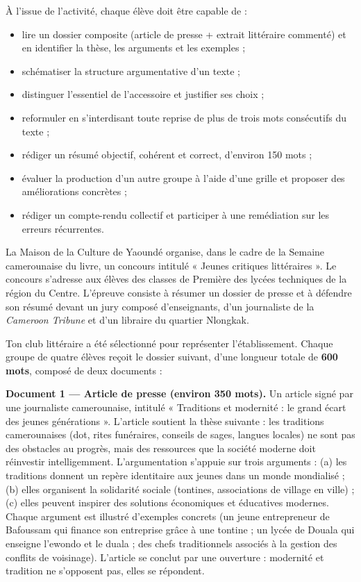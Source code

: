 \documentclass[11pt]{article}
\newcommand{\cle}[1]{{\popxbold\color{popdark}#1}}
\newcounter{popsec}
\newcounter{popsub}
\newcommand{\courssub}[1]{%
  \stepcounter{popsub}%
  \par\vspace{9pt}\noindent{\popxbold\fontsize{11.5}{13}\selectfont\color{popink}{\color{poporange}\thepopsec.\thepopsub}\hspace{6pt}#1}\par\nopagebreak\vspace{4pt}
}
\begin{document}
À l'issue de l'activité, chaque élève doit être capable de :
\begin{itemize}
\item lire un dossier composite (article de presse + extrait littéraire commenté) et en identifier la thèse, les arguments et les exemples ;
\item schématiser la structure argumentative d'un texte ;
\item distinguer l'essentiel de l'accessoire et justifier ses choix ;
\item reformuler en s'interdisant toute reprise de plus de trois mots consécutifs du texte ;
\item rédiger un résumé objectif, cohérent et correct, d'environ 150 mots ;
\item évaluer la production d'un autre groupe à l'aide d'une grille et proposer des améliorations concrètes ;
\item rédiger un compte-rendu collectif et participer à une remédiation sur les erreurs récurrentes.
\end{itemize}

\courssub{Situation}

La \cle{Maison de la Culture de Yaoundé} organise, dans le cadre de la Semaine camerounaise du livre, un concours intitulé « Jeunes critiques littéraires ». Le concours s'adresse aux élèves des classes de Première des lycées techniques de la région du Centre. L'épreuve consiste à résumer un dossier de presse et à défendre son résumé devant un jury composé d'enseignants, d'un journaliste de la \emph{Cameroon Tribune} et d'un libraire du quartier Nlongkak.

Ton club littéraire a été sélectionné pour représenter l'établissement. Chaque groupe de quatre élèves reçoit le dossier suivant, d'une longueur totale de \textbf{600 mots}, composé de deux documents :

\textbf{Document 1 — Article de presse (environ 350 mots).} Un article signé par une journaliste camerounaise, intitulé « Traditions et modernité : le grand écart des jeunes générations ». L'article soutient la thèse suivante : les traditions camerounaises (dot, rites funéraires, conseils de sages, langues locales) ne sont pas des obstacles au progrès, mais des ressources que la société moderne doit réinvestir intelligemment. L'argumentation s'appuie sur trois arguments : (a) les traditions donnent un repère identitaire aux jeunes dans un monde mondialisé ; (b) elles organisent la solidarité sociale (tontines, associations de village en ville) ; (c) elles peuvent inspirer des solutions économiques et éducatives modernes. Chaque argument est illustré d'exemples concrets (un jeune entrepreneur de Bafoussam qui finance son entreprise grâce à une tontine ; un lycée de Douala qui enseigne l'ewondo et le duala ; des chefs traditionnels associés à la gestion des conflits de voisinage). L'article se conclut par une ouverture : modernité et tradition ne s'opposent pas, elles se répondent.
\end{document}

